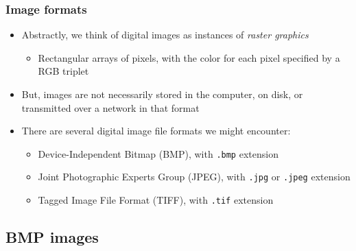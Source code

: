 \documentclass{beamer}
\begin{document}
\begin{frame}
	\frametitle{Image formats}

	\begin{itemize}

		\item Abstractly, we think of digital images as instances of {\em raster graphics}

		\begin{itemize}

			\item Rectangular arrays of pixels, with the color for each pixel specified by a RGB triplet

		\end{itemize}

		\item But, images are not necessarily stored in the computer, on disk, or transmitted over a network in that format

		\item There are several digital image file formats we might encounter:

		\begin{itemize}
	
			\item Device-Independent Bitmap (BMP), with {\tt .bmp} extension

			\item Joint Photographic Experts Group (JPEG), with {\tt .jpg} or {\tt .jpeg} extension

			\item Tagged Image File Format (TIFF), with {\tt .tif} extension

		\end{itemize}

	\end{itemize}
\end{frame}

\subsection{BMP images}
\end{document}
